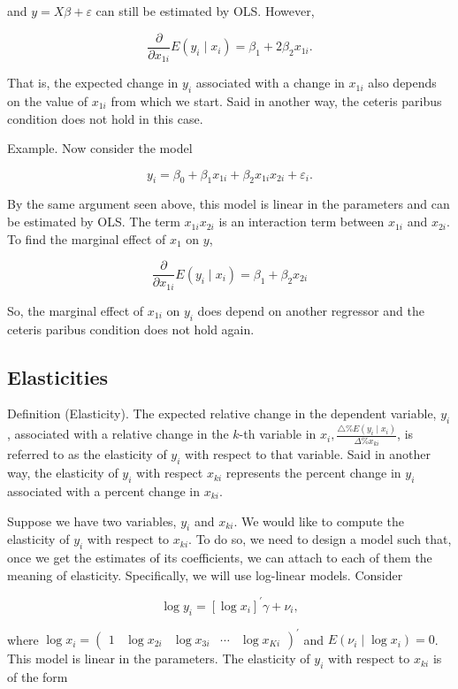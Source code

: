 and $y=X \beta+\varepsilon$ can still be estimated by OLS. However,

$$
\frac{\partial}{\partial x_{1 i}} E\left(y_{i} \mid x_{i}\right)=\beta_{1}+2 \beta_{2} x_{1 i} .
$$

That is, the expected change in $y_{i}$ associated with a change in $x_{1 i}$ also depends on the value of $x_{1 i}$ from which we start. Said in another way, the ceteris paribus condition does not hold in this case.

Example. Now consider the model

$$
y_{i}=\beta_{0}+\beta_{1} x_{1 i}+\beta_{2} x_{1 i} x_{2 i}+\varepsilon_{i} .
$$

By the same argument seen above, this model is linear in the parameters and can be estimated by OLS. The term $x_{1 i} x_{2 i}$ is an interaction term between $x_{1 i}$ and $x_{2 i}$. To find the marginal effect of $x_{1}$ on $y$,

$$
\frac{\partial}{\partial x_{1 i}} E\left(y_{i} \mid x_{i}\right)=\beta_{1}+\beta_{2} x_{2 i}
$$

So, the marginal effect of $x_{1 i}$ on $y_{i}$ does depend on another regressor and the ceteris paribus condition does not hold again.

\subsection{Elasticities}
Definition (Elasticity). The expected relative change in the dependent variable, $y_{i}$, associated with a relative change in the $k$-th variable in $x_{i}, \frac{\triangle \% E\left(y_{i} \mid x_{i}\right)}{\Delta \% x_{k i}}$, is referred to as the elasticity of $y_{i}$ with respect to that variable. Said in another way, the elasticity of $y_{i}$ with respect $x_{k i}$ represents the percent change in $y_{i}$ associated with a percent change in $x_{k i}$.

Suppose we have two variables, $y_{i}$ and $x_{k i}$. We would like to compute the elasticity of $y_{i}$ with respect to $x_{k i}$. To do so, we need to design a model such that, once we get the estimates of its coefficients, we can attach to each of them the meaning of elasticity. Specifically, we will use log-linear models. Consider

$$
\log y_{i}=\left[\log x_{i}\right]^{\prime} \gamma+\nu_{i},
$$

where $\log x_{i}=\left(\begin{array}{lllll}1 & \log x_{2 i} & \log x_{3 i} & \cdots & \log x_{K i}\end{array}\right)^{\prime}$ and $E\left(\nu_{i} \mid \log x_{i}\right)=0$. This model is linear in the parameters. The elasticity of $y_{i}$ with respect to $x_{k i}$ is of the form

